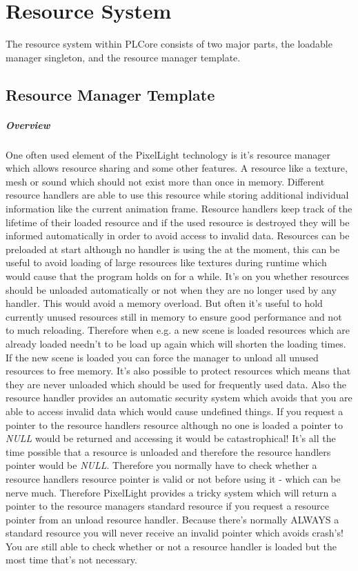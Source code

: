 \chapter{Resource System}
The resource system within PLCore consists of two major parts, the loadable manager singleton, and the resource manager template.




\section{Resource Manager Template}


\paragraph{Overview}
One often used element of the PixelLight technology is it's resource manager which allows resource sharing and some other features. A resource like a texture, mesh or sound which should not exist more than once in memory. Different resource handlers are able to use this resource while storing additional individual information like the current animation frame. Resource handlers keep track of the lifetime of their loaded resource and if the used resource is destroyed they will be informed automatically in order to avoid access to invalid data. Resources can be preloaded at start although no handler is using the at the moment, this can be useful to avoid loading of large resources like textures during runtime which would cause that the program holds on for a while. It's on you whether resources should be unloaded automatically or not when they are no longer used by any handler. This would avoid a memory overload. But often it's useful to hold currently unused resources still in memory to ensure good performance and not to much reloading. Therefore when e.g. a new scene is loaded resources which are already loaded needn't to be load up again which will shorten the loading times. If the new scene is loaded you can force the manager to unload all unused resources to free memory. It's also possible to protect resources which means that they are never unloaded which should be used for frequently used data. Also the resource handler provides an automatic security system which avoids that you are able to access invalid data which would cause undefined things. If you request a pointer to the resource handlers resource although no one is loaded a pointer to \emph{NULL} would be returned and accessing it would be catastrophical! It's all the time possible that a resource is unloaded and therefore the resource handlers pointer would be \emph{NULL}. Therefore you normally have to check whether a resource handlers resource pointer is valid or not before using it - which can be nerve much. Therefore PixelLight provides a tricky system which will return a pointer to the resource managers standard resource if you request a resource pointer from an unload resource handler. Because there's normally ALWAYS a standard resource you will never receive an invalid pointer which avoids crash's! You are still able to check whether or not a resource handler is loaded but the most time that's not necessary.

